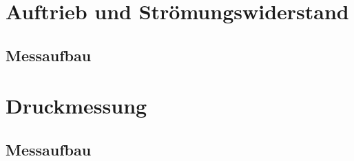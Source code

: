 \section{Auftrieb und Strömungswiderstand}
\subsection{Messaufbau}

\section{Druckmessung}
\subsection{Messaufbau}